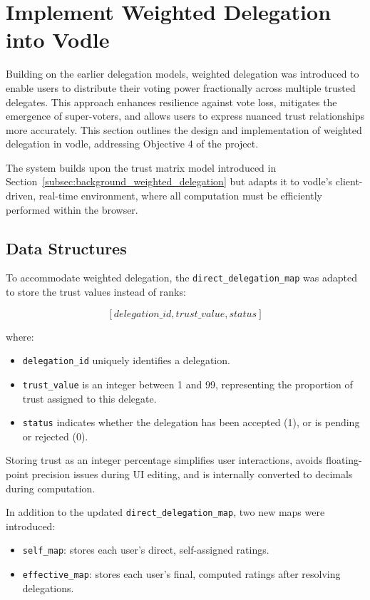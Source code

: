 \section{Implement Weighted Delegation into Vodle}

Building on the earlier delegation models, weighted delegation was introduced to enable users to distribute their voting power fractionally across multiple trusted delegates. This approach enhances resilience against vote loss, mitigates the emergence of super-voters, and allows users to express nuanced trust relationships more accurately. This section outlines the design and implementation of weighted delegation in vodle, addressing Objective 4 of the project.

The system builds upon the trust matrix model introduced in Section~\ref{subsec:background_weighted_delegation} but adapts it to vodle's client-driven, real-time environment, where all computation must be efficiently performed within the browser.

\subsection{Data Structures}

To accommodate weighted delegation, the \texttt{direct\_delegation\_map} was adapted to store the trust values instead of ranks:

\[
[delegation\_id, trust\_value, status]
\]

where:
\begin{itemize}
    \item \texttt{delegation\_id} uniquely identifies a delegation.
    \item \texttt{trust\_value} is an integer between 1 and 99, representing the proportion of trust assigned to this delegate.
    \item \texttt{status} indicates whether the delegation has been accepted (1), or is pending or rejected (0).
\end{itemize}

Storing trust as an integer percentage simplifies user interactions, avoids floating-point precision issues during UI editing, and is internally converted to decimals during computation.

In addition to the updated \texttt{direct\_delegation\_map}, two new maps were introduced:
\begin{itemize}
    \item \texttt{self\_map}: stores each user's direct, self-assigned ratings.
    \item \texttt{effective\_map}: stores each user's final, computed ratings after resolving delegations.
\end{itemize}

